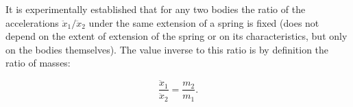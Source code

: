 It is experimentally established that for any two bodies the ratio of the accelerations $\ddot{x}_1/\ddot{x}_2$ under the same extension of a spring is fixed (does not depend on the extent of extension of the spring or on its characteristics, but only on the bodies themselves). The value inverse to this ratio is by definition the ratio of masses:

$$\frac{\ddot{x}_1}{\ddot{x}_2} = \frac{m_2}{m_1}.$$
